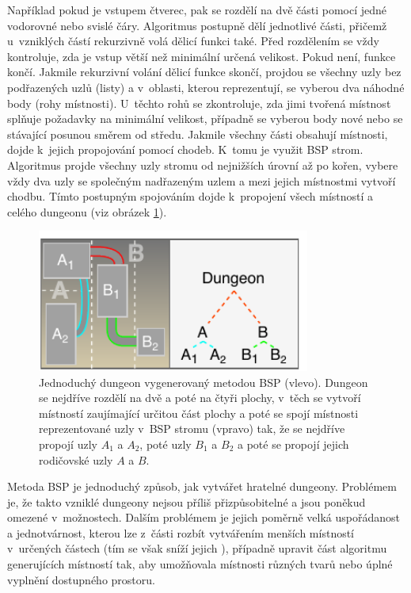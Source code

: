 Například pokud je vstupem čtverec, pak se rozdělí na dvě části pomocí jedné vodorovné nebo svislé čáry.
Algoritmus postupně dělí jednotlivé části, přičemž u~vzniklých částí rekurzivně volá dělicí funkci také.
Před rozdělením se vždy kontroluje, zda je vstup větší než minimální určená velikost.
Pokud není, funkce končí.
Jakmile rekurzivní volání dělicí funkce skončí, projdou se všechny uzly bez podřazených uzlů (listy) a v~oblasti, kterou reprezentují, se vyberou dva náhodné body (rohy místnosti).
U~těchto rohů se zkontroluje, zda jimi tvořená místnost splňuje požadavky na minimální velikost, případně se vyberou body nové nebo se stávající posunou směrem od středu.
Jakmile všechny části obsahují místnosti, dojde k~jejich propojování pomocí chodeb.
K~tomu je využit BSP strom.
Algoritmus projde všechny uzly stromu od nejnižších úrovní až po kořen, vybere vždy dva uzly se společným nadřazeným uzlem a mezi jejich místnostmi vytvoří chodbu.
Tímto postupným spojováním dojde k~propojení všech místností a celého dungeonu (viz obrázek \ref{img:bsp_second})\cite{lit:pcg_constructive_methods}.
\par
\begin{figure}[hbt]
    \centering
    \includegraphics[width=0.8\textwidth]{obrazky/bsp_second.pdf}
    \caption{Jednoduchý dungeon vygenerovaný metodou BSP (vlevo). Dungeon se nejdříve rozdělí na dvě a poté na čtyři plochy, v~těch se vytvoří místností zaujímající určitou část plochy a poté se spojí místnosti reprezentované uzly v~BSP stromu (vpravo) tak, že se nejdříve propojí uzly $A_1$ a $A_2$, poté uzly $B_1$ a $B_2$ a poté se propojí jejich rodičovské uzly $A$ a $B$.} 
    \label{img:bsp_second}
\end{figure}
Metoda BSP je jednoduchý způsob, jak vytvářet hratelné dungeony.
Problémem je, že takto vzniklé dungeony nejsou příliš přizpůsobitelné a jsou poněkud omezené v~možnostech.
Dalším problémem je jejich poměrně velká uspořádanost a jednotvárnost, kterou lze z~části rozbít vytvářením menších místností v~určených částech (tím se však sníží jejich ), případně upravit část algoritmu generujících místností tak, aby umožňovala místnosti různých tvarů nebo úplné vyplnění dostupného prostoru.

